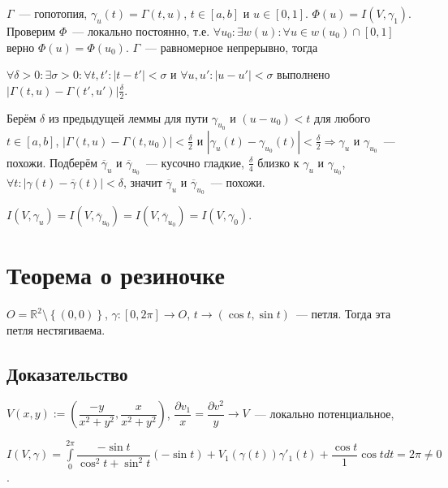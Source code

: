 \documentclass{article}
\begin{document}
            $\Gamma$~--- гопотопия, $\gamma_u(t) = \Gamma(t, u)$, $t \in [a, b]$ и $u \in [0, 1]$. $\Phi(u) = I(V, \gamma_1)$. Проверим $\Phi$~--- локально постоянно, т.е. $\forall u_0 : \exists w(u) : \forall u \in w(u_0) \cap [0, 1]$ верно $\Phi(u) = \Phi(u_0)$. $\Gamma$~--- равномерное непрерывно, тогда
            
            $\forall \delta > 0 : \exists \sigma > 0 : \forall t, t' : | t - t' | < \sigma$ и $\forall u, u' : | u - u' | < \sigma$ выполнено $\left| \Gamma(t, u) - \Gamma(t', u') \right|  \frac{\delta}{2}$.
            
            Берём $\delta$ из предыдущей леммы для пути $\gamma_{u_0}$ и $(u - u_0) < t$ для любого $t \in [a, b]$, $\left| \Gamma(t, u) - \Gamma(t, u_0) \right| < \frac{\delta}{2}$ и $\left| \gamma_u(t) - \gamma_{u_0}(t) \right| < \frac{\delta}{2} \Rightarrow \gamma_u$ и $\gamma_{u_0}$~--- похожи. Подберём $\overline{\gamma}_u$ и $\overline{\gamma}_{u_0}$~--- кусочно гладкие, $\frac{\delta}{4}$ близко к $\gamma_u$ и $\gamma_{u_0}$, $\forall t : | \gamma(t) - \overline{\gamma}(t) | < \delta$, значит $\overline{\gamma}_u$ и $\overline{\gamma}_{u_0}$~--- похожи.
            
            $I(V, \gamma_u) = I(V, \overline{\gamma}_{u_0}) = I(V, \overline{\gamma}_{u_0}) = I(V, \gamma_0)$.
    
    \newpage
    
    \section{Теорема о  резиночке}
    
        $O = \mathbb{R}^2 \setminus \left\{ (0, 0) \right\}$, $\gamma : [0, 2 \pi] \rightarrow O$, $t \rightarrow (\cos{t}, \sin{t})$~--- петля. Тогда эта петля нестягиваема.
        
        \subsection{Доказательство}
        
            $V(x, y) := \left( \dfrac{-y}{x^2 + y^2}, \dfrac{x}{x^2 + y^2} \right)$, $\dfrac{\partial v_1}{x} = \dfrac{\partial v^2}{y} \rightarrow V$~--- локально потенциальное,
            
            $I(V, \gamma) = \int\limits^{2 \pi}_0 \dfrac{-\sin{t}}{\cos^2{t} + \sin^2{t}} (-\sin{t}) + V_1(\gamma(t))\gamma'_1(t) + \dfrac{\cos{t}}{1} \cos{t}dt = 2 \pi \neq 0$.
            
\end{document}
